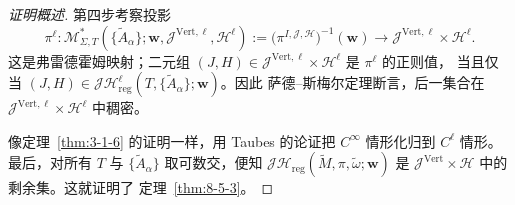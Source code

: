 \begin{proof}[证明概述]
第四步考察投影
\[
  \pi^\ell:
  \mathcal M^*_{\Sigma,T}
  (\{\widetilde A_\alpha\};\mathbf w,
    \mathcal J^{\mathrm{Vert},\ell},\mathcal H^\ell)
  :=\bigl(\pi^{I,\mathcal J,\mathcal H}\bigr)^{-1}(\mathbf w)
  \longrightarrow\mathcal J^{\mathrm{Vert},\ell}\times\mathcal H^\ell.
\]
这是弗雷德霍姆映射；二元组
$(J,H)\in\mathcal J^{\mathrm{Vert},\ell}\times\mathcal H^\ell$ 是 $\pi^\ell$ 的正则值，
当且仅当
$(J,H)\in\mathcal J\mathcal H^\ell_{\mathrm{reg}}
(T,\{\widetilde A_\alpha\};\mathbf w)$。因此 萨德--斯梅尔定理断言，后一集合在
$\mathcal J^{\mathrm{Vert},\ell}\times\mathcal H^\ell$ 中稠密。

像定理~\ref{thm:3-1-6} 的证明一样，用 Taubes 的论证把 $C^\infty$ 情形化归到
$C^\ell$ 情形。最后，对所有 $T$ 与 $\{\widetilde A_\alpha\}$ 取可数交，便知
$\mathcal J\mathcal H_{\mathrm{reg}}
(\widetilde M,\pi,\widetilde\omega;\mathbf w)$ 是
$\mathcal J^{\mathrm{Vert}}\times\mathcal H$ 中的剩余集。这就证明了
定理~\ref{thm:8-5-3}。
\end{proof}

